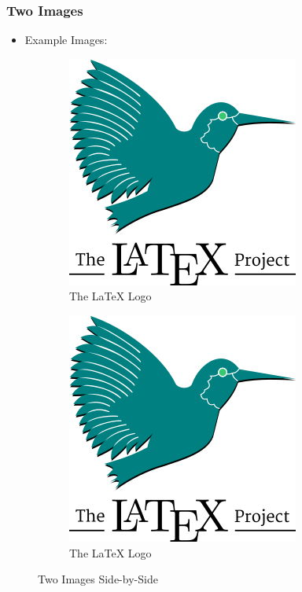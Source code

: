 \documentclass{article}
\begin{document}
			\subsubsection{Two Images}
				\begin{itemize}
					\item Example Images:
				\end{itemize}
				\begin{figure}[h!]
					\centering
					\begin{subfigure}[b]{0.4\linewidth}
						\includegraphics[width=0.8\linewidth]{images/LaTeXLogo.jpg}
						\caption{The \LaTeX{} Logo}
					\end{subfigure}
					\begin{subfigure}[b]{0.4\linewidth}
						\includegraphics[width=0.8\linewidth]{images/LaTeXLogo.jpg}
						\caption{The \LaTeX{} Logo}
					\end{subfigure}
					\caption{Two Images Side-by-Side}
				\end{figure}
\end{document}
